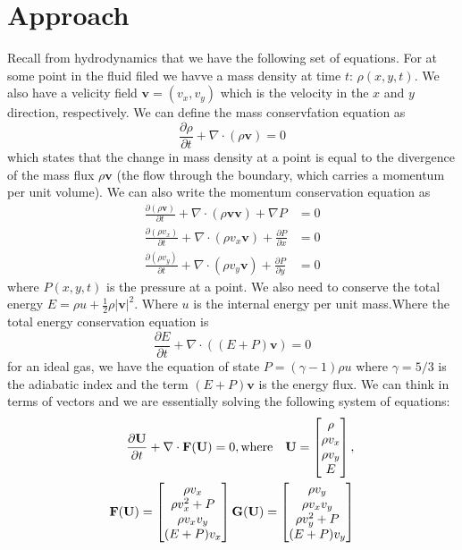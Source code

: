\documentclass[12pt]{article}
\begin{document}
\section{Approach}
Recall from hydrodynamics that we have the following set of equations. For at some point in the fluid filed we havve a mass density at time $t$: $\rho(x,y,t)$. We also have a velicity field $\mathbf{v}=(v_x, v_y)$ which is the velocity in the $x$ and $y$ direction, respectively. We can define the mass conservfation equation as
\begin{equation}
\frac{\partial \rho}{\partial t} + \nabla \cdot (\rho \mathbf{v}) = 0
\end{equation}
which states that the change in mass density at a point is equal to the divergence of the mass flux $\rho \mathbf{v}$ (the flow through the boundary, which carries a momentum per unit volume). We can also write the momentum conservation equation as
\begin{align*}
\frac{\partial (\rho \mathbf{v})}{\partial t} + \nabla \cdot (\rho \mathbf{v} \mathbf{v} ) +\nabla P &= 0\\
\frac{\partial (\rho v_x)}{\partial t} + \nabla \cdot (\rho v_x \mathbf{v} ) +\frac{\partial P}{\partial x} &= 0\\
\frac{\partial (\rho v_y)}{\partial t} + \nabla \cdot (\rho v_y \mathbf{v} ) +\frac{\partial P}{\partial y} &= 0 
\end{align*}
where $P(x,y,t)$ is the pressure at a point. We also need to conserve the total energy $E = \rho u + \frac{1}{2} \rho |\mathbf{v}|^2$. Where $u$ is the internal energy per unit mass.Where the total energy conservation equation is
\begin{equation}
\frac{\partial E}{\partial t} + \nabla \cdot ((E+P)\mathbf{v}) = 0
\end{equation}
for an ideal gas, we have the equation of state $P = (\gamma - 1) \rho u$ where $\gamma = 5/3$ is the adiabatic index and the term $(E+P)\mathbf{v}$ is the energy flux. We can think in terms of vectors and we are essentially solving the following system of equations:
\begin{align*}
\frac{\partial \mathbf{U}}{\partial t} + \nabla \cdot \mathbf{F}(\mathbf{U}) = 0, {\rm where} \quad
\mathbf{U} = \begin{bmatrix}\rho \\ \rho v_x \\ \rho v_y \\ E
\end{bmatrix}, \\ 
\mathbf{F}(\mathbf{U}) = \begin{bmatrix}\rho v_x \\ \rho v_x^2 + P \\ \rho v_x v_y \\ (E+P) v_x \end{bmatrix} 
\mathbf{G}(\mathbf{U}) = \begin{bmatrix}\rho v_y \\ \rho v_x v_y \\ \rho v_y^2 + P \\ (E+P) v_y \end{bmatrix}
\end{align*}
\end{document}
